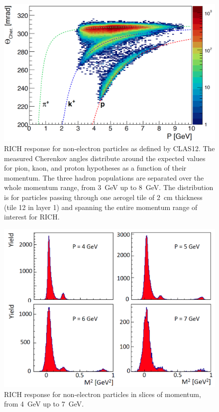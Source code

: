 \documentclass[5p,times,twocolumn]{elsarticle}
\begin{document}
\begin{figure}[t]
\begin{center}
\includegraphics[width=1.0\columnwidth]{Hadron_PID.png}
\end{center}
\caption{RICH response for non-electron particles as defined by CLAS12. The measured Cherenkov angles distribute
  around the expected values for pion, kaon, and proton hypotheses as a function of their momentum. The three hadron
  populations are separated over the whole momentum range, from 3~GeV up to 8~GeV. The distribution is for
  particles passing through one aerogel tile of 2~cm thickness (tile 12 in layer 1) and spanning the entire momentum
  range of interest for RICH.}
\label{Fig:CHhad1}
\end{figure}

\begin{figure}[t]
\begin{center}
\includegraphics[width=1.0\columnwidth]{mass_vs_mom.png}
\end{center}
\caption{RICH response for non-electron particles in slices of momentum, from 4~GeV up to 7~GeV.}
\label{Fig:CHhad2}
\end{figure}
\end{document}
